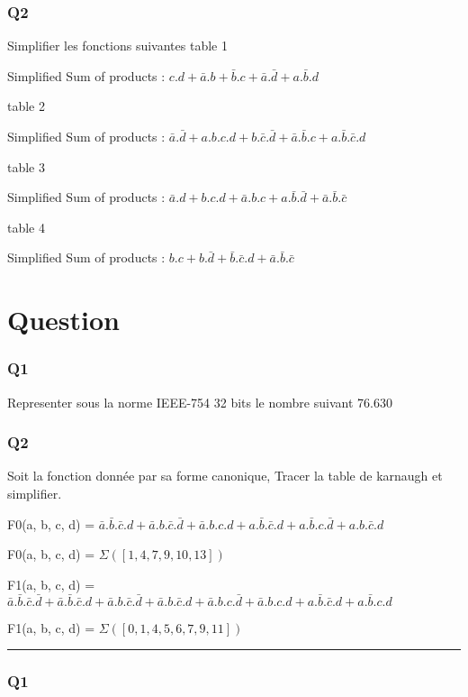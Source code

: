 \subsubsection{Q2}

Simplifier les fonctions suivantes
table 1

Simplified Sum of products : $c.d+\bar a.b+\bar b.c+\bar a.\bar d+a.\bar b.d$

table 2

Simplified Sum of products : $\bar a.\bar d+a.b.c.d+b.\bar c.\bar d+\bar a.\bar b.c+a.\bar b.\bar c.d$

table 3

Simplified Sum of products : $\bar a.d+b.c.d+\bar a.b.c+a.\bar b.\bar d+\bar a.\bar b.\bar c$

table 4

Simplified Sum of products : $b.c+b.\bar d+\bar b.\bar c.d+\bar a.\bar b.\bar c$

\pagebreak
\section{Question}

\subsubsection{Q1}

Representer sous la norme IEEE-754 32 bits le nombre suivant
76.630
\subsubsection{Q2}

Soit la fonction donnée par sa forme canonique, Tracer la table de karnaugh et simplifier.

F0(a, b, c, d) = $\bar a.\bar b.\bar c.d + \bar a.b.\bar c.\bar d + \bar a.b.c.d + a.\bar b.\bar c.d + a.\bar b.c.\bar d + a.b.\bar c.d$

F0(a, b, c, d) = $\varSigma([1, 4, 7, 9, 10, 13])$

F1(a, b, c, d) = $\bar a.\bar b.\bar c.\bar d + \bar a.\bar b.\bar c.d + \bar a.b.\bar c.\bar d + \bar a.b.\bar c.d + \bar a.b.c.\bar d + \bar a.b.c.d + a.\bar b.\bar c.d + a.\bar b.c.d$

F1(a, b, c, d) = $\varSigma([0, 1, 4, 5, 6, 7, 9, 11])$


\hrule width 1\linewidth
\subsubsection{Q1}

